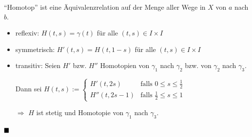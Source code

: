 \begin{bemerkung}
    \enquote{Homotop} ist eine Äquivalenzrelation auf der Menge aller
    Wege in $X$ von $a$ nach $b$.
\end{bemerkung}

\begin{beweis}\leavevmode
    \begin{itemize}
        \item reflexiv: $H(t,s) = \gamma(t)$ für alle $(t,s) \in I \times I$
        \item symmetrisch: $H'(t,s) = H(t,1-s)$ für alle $(t,s) \in I \times I$
        \item transitiv: Seien $H'$ bzw. $H''$ Homotopien von $\gamma_1$
              nach $\gamma_2$ bzw. von $\gamma_2$ nach $\gamma_3$.

              Dann sei $H(t,s) := \begin{cases}
              H'(t, 2s)    &\text{falls } 0 \leq s \leq \frac{1}{2}\\
              H''(t, 2s-1) &\text{falls } \frac{1}{2} \leq s \leq 1\end{cases}$

              $\Rightarrow$ $H$ ist stetig und Homotopie von $\gamma_1$ nach 
              $\gamma_3$.
    \end{itemize}
    $\qed$
\end{beweis}

